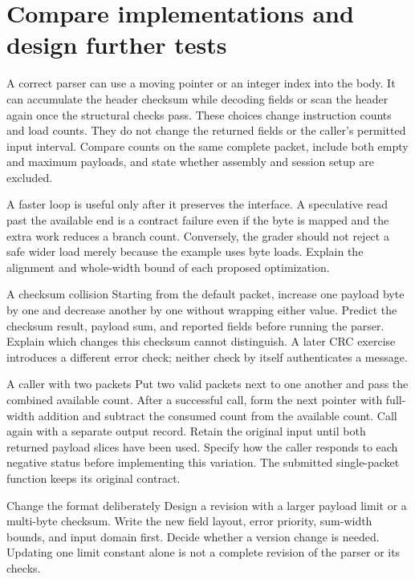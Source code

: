 \section{Compare implementations and design further tests}
A correct parser can use a moving pointer or an integer index into the body. It
can accumulate the header checksum while decoding fields or scan the header again
once the structural checks pass. These choices change instruction counts and load
counts. They do not change the returned fields or the caller's permitted input
interval. Compare counts on the same complete packet, include both empty and
maximum payloads, and state whether assembly and session setup are excluded.

A faster loop is useful only after it preserves the interface. A speculative read
past the available end is a contract failure even if the byte is mapped and the
extra work reduces a branch count. Conversely, the grader should not reject a safe
wider load merely because the example uses byte loads. Explain the alignment and
whole-width bound of each proposed optimization.

\begin{MARSExercise}{A checksum collision}
  Starting from the default packet, increase one payload byte by one and decrease
  another by one without wrapping either value. Predict the checksum result, payload
  sum, and reported fields before running the parser. Explain which changes this
  checksum cannot distinguish. A later CRC exercise introduces a different error
  check; neither check by itself authenticates a message.
\end{MARSExercise}

\begin{MARSExercise}{A caller with two packets}
  Put two valid packets next to one another and pass the combined available count.
  After a successful call, form the next pointer with full-width addition and subtract
  the consumed count from the available count. Call again with a separate output
  record. Retain the original input until both returned payload slices have been
  used. Specify how the caller responds to each negative status before implementing
  this variation. The submitted single-packet function keeps its original contract.
\end{MARSExercise}

\begin{MARSExercise}{Change the format deliberately}
  Design a revision with a larger payload limit or a multi-byte checksum. Write the
  new field layout, error priority, sum-width bounds, and input domain first. Decide
  whether a version change is needed. Updating one limit constant alone is not a
  complete revision of the parser or its checks.
\end{MARSExercise}
